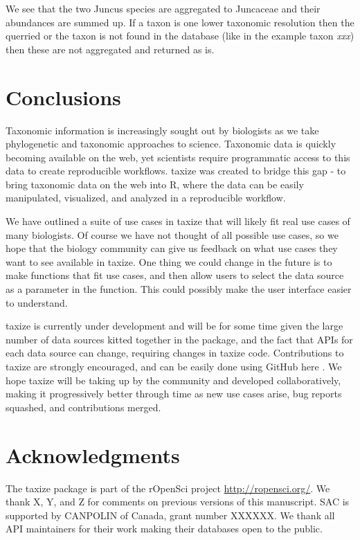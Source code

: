 \documentclass[10pt]{article}\usepackage[]{graphicx}\usepackage[]{color}
\begin{document}
We see that the two Juncus species are aggregated to Juncaceae and their abundances are summed up. If a taxon is one lower taxonomic resolution then the querried or the taxon is not found in the database (like in the example taxon \emph{xxx}) then these are not aggregated and returned as is.


\section*{Conclusions}
Taxonomic information is increasingly sought out by biologists as we take phylogenetic and taxonomic approaches to science. Taxonomic data is quickly becoming available on the web, yet scientists require programmatic access to this data to create reproducible workflows. taxize was created to bridge this gap - to bring taxonomic data on the web into R, where the data can be easily manipulated, visualized, and analyzed in a reproducible workflow.

We have outlined a suite of use cases in taxize that will likely fit real use cases of many biologists. Of course we have not thought of all possible use cases, so we hope that the biology community can give us feedback on what use cases they want to see available in taxize. One thing we could change in the future is to make  functions that fit use cases, and then allow users to select the data source as a parameter in the function. This could possibly make the user interface easier to understand.

taxize is currently under development and will be for some time given the large number of data sources kitted together in the package, and the fact that APIs for each data source can change, requiring changes in taxize code. Contributions to taxize are strongly encouraged, and can be easily done using GitHub here \cite{github_taxize}. We hope taxize will be taking up by the community and developed collaboratively, making it progressively better through time as new use cases arise, bug reports squashed, and contributions merged.


\section*{Acknowledgments}
The taxize package is part of the rOpenSci project \url{http://ropensci.org/}. We thank X, Y, and Z for comments on previous versions of this manuscript. SAC is supported by CANPOLIN of Canada, grant number XXXXXX. We thank all API maintainers for their work making their databases open to the public.
\end{document}
